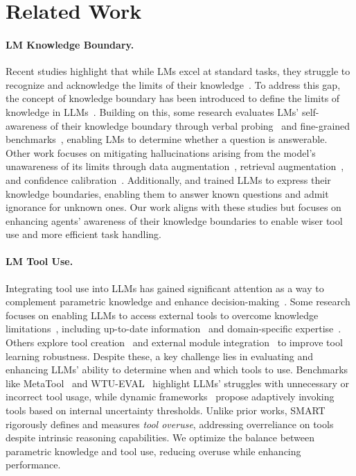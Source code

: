 \section{Related Work}

\paragraph{LM Knowledge Boundary.}
Recent studies highlight that while LMs excel at standard tasks, they struggle to recognize and acknowledge the limits of their knowledge~\cite{yin2023large, kadavath2022language}. To address this gap, the concept of knowledge boundary has been introduced to define the limits of knowledge in LLMs~\cite{li2024knowledge, amayuelas2023knowledge}.
Building on this, some research evaluates LMs' self-awareness of their knowledge boundary through verbal probing~\citep{kadavath2022language} and fine-grained benchmarks~\citep{yin2024benchmarking}, enabling LMs to determine whether a question is answerable.
Other work focuses on mitigating hallucinations arising from the model’s unawareness of its limits through data augmentation~\cite{chen2023gotta,chen-etal-2024-minprompt}, retrieval augmentation~\cite{ren2023investigating}, and confidence calibration~\citep{xue2024ualign}. Additionally, \citet{chen2024teaching} and \citet{zhang2024r} trained LLMs to express their knowledge boundaries, enabling them to answer known questions and admit ignorance for unknown ones.
Our work aligns with these studies but focuses on enhancing agents' awareness of their knowledge boundaries to enable wiser tool use and more efficient task handling.

\paragraph{LM Tool Use.}
Integrating tool use into LLMs has gained significant attention as a way to complement parametric knowledge and enhance decision-making~\cite{qin2023tool, qu2025tool}. Some research focuses on enabling LLMs to access external tools to overcome knowledge limitations~\citep{qin2023toolllm, qian2024toolink}, including up-to-date information~\citep{vu2023freshllms, wang2024uniretriever} and domain-specific expertise~\citep{ling2023domain, wang2024appbench}. Others explore tool creation~\citep{qian2023creator, cai2023large} and external module integration~\citep{qian2024investigate} to improve tool learning robustness. Despite these, a key challenge lies in evaluating and enhancing LLMs’ ability to determine when and which tools to use. Benchmarks like MetaTool~\cite{huang2023metatool} and WTU-EVAL~\cite{ning2024wtu} highlight LLMs' struggles with unnecessary or incorrect tool usage, while dynamic frameworks~\cite{wang2024selfdc, shen2024smartcal} propose adaptively invoking tools based on internal uncertainty thresholds. Unlike prior works, SMART rigorously defines and measures \textit{tool overuse}, addressing overreliance on tools despite intrinsic reasoning capabilities. We optimize the balance between parametric knowledge and tool use, reducing overuse while enhancing performance.
